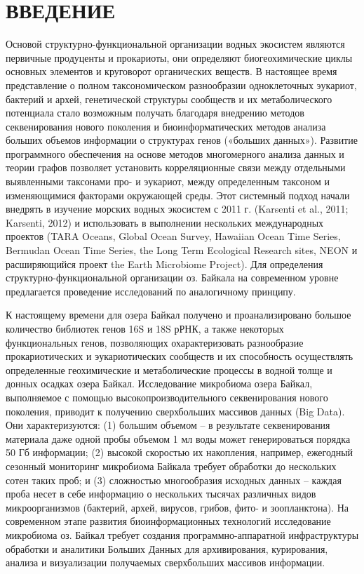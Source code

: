 \documentclass[a4paper,12pt,openany,final]{extreport}
\begin{document}
\chapter*{ВВЕДЕНИЕ}

Основой структурно-функциональной организации водных экосистем являются
первичные продуценты и прокариоты, они определяют биогеохимические циклы
основных элементов и круговорот органических веществ. В настоящее время
представление о полном таксономическом разнообразии одноклеточных
эукариот, бактерий и архей, генетической структуры сообществ и их
метаболического потенциала стало возможным получать благодаря внедрению
методов секвенирования нового поколения и биоинформатических методов
анализа больших объемов информации о структурах генов («больших
данных»). Развитие программного обеспечения на основе методов
многомерного анализа данных и теории графов позволяет установить
корреляционные связи между отдельными выявленными таксонами про- и
эукариот, между определенным таксоном и изменяющимися факторами
окружающей среды. Этот системный подход начали внедрять в изучение
морских водных экосистем с 2011 г. (Karsenti et al., 2011; Karsenti,
2012) и использовать в выполнении нескольких международных проектов
(TARA Oceans, Global Ocean Survey, Hawaiian Ocean Time Series, Bermudan
Ocean Time Series, the Long Term Ecological Research sites, NEON и
расширяющийся проект the Earth Microbiome Project). Для определения
структурно-функциональной организации оз. Байкала на современном уровне
предлагается проведение исследований по аналогичному принципу.

К настоящему времени для озера Байкал получено и проанализировано
большое количество библиотек генов 16S и 18S рРНК, а также некоторых
функциональных генов, позволяющих охарактеризовать разнообразие
прокариотических и эукариотических сообществ и их способность
осуществлять определенные геохимические и метаболические процессы в
водной толще и донных осадках озера Байкал. Исследование микробиома
озера Байкал, выполняемое с помощью высокопроизводительного
секвенирования нового поколения, приводит к получению сверхбольших
массивов данных (Big Data). Они характеризуются: (1) большим объемом --
в результате секвенирования материала даже одной пробы объемом 1 мл воды
может генерироваться порядка 50 Гб информации; (2) высокой скоростью их
накопления, например, ежегодный сезонный мониторинг микробиома Байкала
требует обработки до нескольких сотен таких проб; и (3) сложностью
многообразия исходных данных -- каждая проба несет в себе информацию о
нескольких тысячах различных видов микроорганизмов (бактерий, архей,
вирусов, грибов, фито- и зоопланктона). На современном этапе развития
биоинформационных технологий исследование микробиома оз. Байкал требует
создания программно-аппаратной инфраструктуры обработки и аналитики
Больших Данных для архивирования, курирования, анализа и визуализации
получаемых сверхбольших массивов информации.
\end{document}

